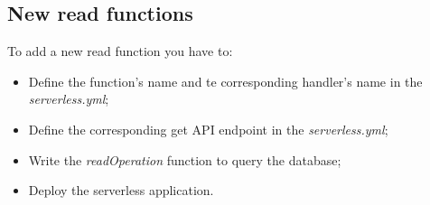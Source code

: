 \subsection{New read functions}
To add a new read function you have to:
\begin{itemize}
	\item Define the function's name and te corresponding handler's name in the \emph{serverless.yml};
	\item Define the corresponding get API endpoint in the \emph{serverless.yml};
	\item Write the \emph{readOperation} function to query the database;
	\item Deploy the serverless application.
\end{itemize}